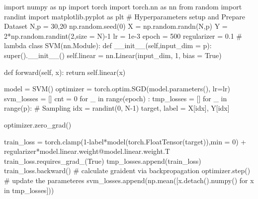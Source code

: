 \documentclass[10pt]{article}
\begin{document}
\begin{python}
import numpy as np
import torch
import torch.nn as nn
from random import randint
import matplotlib.pyplot as plt
# Hyperparameters setup and Prepare Dataset
N,p = 30,20
np.random.seed(0)
X = np.random.randn(N,p)
Y = 2*np.random.randint(2,size = N)-1
lr = 1e-3
epoch = 500
regularizer = 0.1 # lambda
class SVM(nn.Module):
    def __init__(self,input_dim = p):
        super().__init__()
        self.linear = nn.Linear(input_dim, 1, bias = True)
    
    def forward(self, x):
        return self.linear(x)

model = SVM()
optimizer = torch.optim.SGD(model.parameters(), lr=lr) 
svm_losses = []
cnt = 0
for _ in range(epoch) :
    tmp_losses = []
    for _ in range(p):
        # Sampling
        idx = randint(0, N-1)
        target, label = X[idx], Y[idx]

        optimizer.zero_grad()
        
        train_loss = torch.clamp(1-label*model(torch.FloatTensor(target)),min = 0) + regularizer*model.linear.weight@model.linear.weight.T
        train_loss.requires_grad_(True)
        tmp_losses.append(train_loss)
        train_loss.backward() # calculate graident via backpropagation
        optimizer.step() # update the parameteres
    svm_losses.append(np.mean([x.detach().numpy() for x in tmp_losses]))
\end{python}
\end{document}
